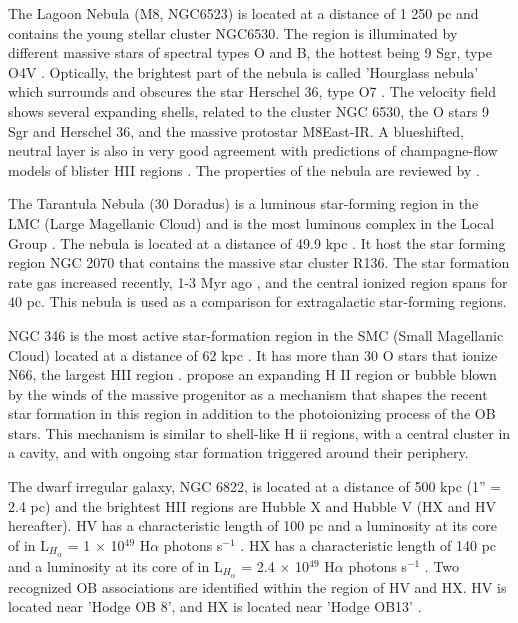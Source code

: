 \documentclass[fleqn,usenatbib, useAMS, a4paper]{mnras}
\begin{document}
The Lagoon Nebula (M8, NGC6523) is located at a distance of 1 250 pc \citep{2005A&A...430..941P} and contains the young stellar cluster NGC6530.
The region is illuminated by different massive stars of spectral types O and B, the hottest being 9 Sgr, type O4V \citep{Damiani:2017b}.
Optically, the brightest part of the nebula is called 'Hourglass nebula' which surrounds and obscures the star Herschel 36, type O7 \citep{1986AJ.....91..870W}. 
The velocity field shows several expanding shells, related to the cluster NGC 6530, the O stars 9 Sgr and Herschel 36, and the massive protostar M8East-IR. A blueshifted, neutral layer is also in very good agreement with predictions of champagne-flow models of blister HII regions \citep{Damiani:2017b}. The properties of the nebula are reviewed by \citet{2008hsf2.book..533T}.

The Tarantula Nebula (30 Doradus) is a luminous star-forming region in the LMC (Large Magellanic Cloud) and is the most luminous complex in the Local Group \citep{1984ApJ...287..116K}. The nebula is located at a distance of 49.9 kpc \citep{2013Natur.495...76P}.
It host the star forming region NGC 2070 that contains the massive star cluster R136. 
The star formation rate gas increased recently, 1-3 Myr ago \citep{2016ApJ...833..154C}, and the central ionized region spans for 40 pc.
This nebula is used as a comparison for extragalactic star-forming regions.

NGC 346 is the most active star-formation region in the SMC (Small Magellanic Cloud) located at a distance of 62 kpc \citep{2001ApJ...562..303D}. 
It has more than 30 O stars that ionize N66, the largest HII region \citep{2011ApJ...740...10D}.
\citet{2008ApJ...688.1050G} propose an expanding H II region or bubble blown by the winds of the massive progenitor as a mechanism that shapes the recent star formation in this region in addition to the photoionizing process of the OB stars. 
This mechanism is similar to shell-like H ii regions, with a central cluster in a cavity, and with ongoing star formation triggered around their periphery.

The dwarf irregular galaxy, NGC 6822, is located at a distance of 500 kpc (1'' = 2.4 pc) \citep{2012A&A...540A.135S} and the brightest HII regions are Hubble X and Hubble V (HX and HV hereafter).
HV has a characteristic length of 100 pc and a luminosity at its core of in L$_{H_\alpha}$ = 1 $\times$ 10$^{49}$ H$\alpha$ photons s$^{-1}$ \citep{1999PASP..111.1382O}.
HX has a characteristic length of 140 pc and a luminosity at its core of in L$_{H_\alpha}$ = 2.4 $\times$ 10$^{49}$ H$\alpha$ photons s$^{-1}$ \citep{1999PASP..111.1382O}.
Two recognized OB associations \citep{1991ApJ...379..621H,1992AJ....104.1374W} are identified within the region of HV and HX. HV is located near 'Hodge OB 8', and HX is located near 'Hodge OB13'  \citep{1999PASP..111.1382O}.
\end{document}
